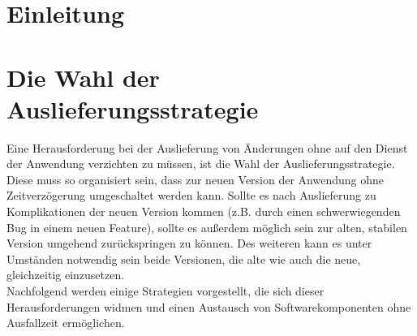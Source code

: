 \documentclass[deutsch]{lib/llncs/llncs}
\begin{document}
\newpage


\section{Einleitung}


\section{Die Wahl der Auslieferungsstrategie}
Eine Herausforderung bei der Auslieferung von Änderungen ohne auf den Dienst der Anwendung verzichten zu müssen, ist die Wahl der Auslieferungsstrategie. Diese muss so organisiert sein, dass zur neuen Version der Anwendung ohne Zeitverzögerung umgeschaltet werden kann. Sollte es nach Auslieferung zu Komplikationen der neuen Version kommen (z.B. durch einen schwerwiegenden Bug in einem neuen Feature), sollte es außerdem möglich sein zur alten, stabilen Version umgehend zurückspringen zu können. Des weiteren kann es unter Umständen notwendig sein beide Versionen, die alte wie auch die neue, gleichzeitig einzusetzen.\\
Nachfolgend werden einige Strategien vorgestellt, die sich dieser Herausforderungen widmen und einen Austausch von Softwarekomponenten ohne Ausfallzeit ermöglichen. 
\end{document}
